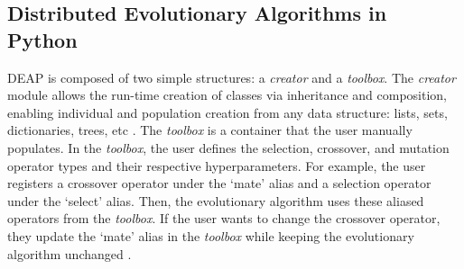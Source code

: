 \subsection{Distributed Evolutionary Algorithms in Python}
\label{sec:deap-works}
\gls{DEAP} is composed of two simple structures: a \textit{creator} and a 
\textit{toolbox}.  
The \textit{creator} module allows the run-time creation of classes via 
inheritance and composition, enabling individual and population creation 
from any data structure: lists, sets, dictionaries, trees, etc \cite{fortin_deap_2012}. 
The \textit{toolbox} is a container that the user manually populates.
In the \textit{toolbox}, the user defines the selection, crossover, and 
mutation operator types and their respective hyperparameters.
For example, the user registers a crossover operator under the `mate'
alias and a selection operator under the `select' alias. 
Then, the evolutionary algorithm uses these aliased operators from the 
\textit{toolbox}. 
If the user wants to change the crossover operator, they update the 
`mate' alias in the \textit{toolbox} while keeping the evolutionary algorithm 
unchanged \cite{fortin_deap_2012}. 

